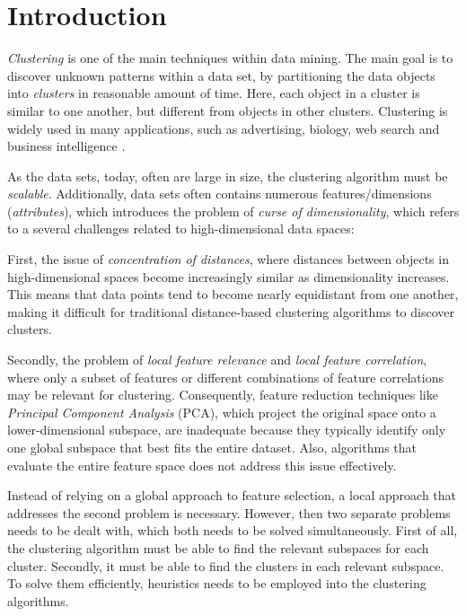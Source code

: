 \section{Introduction}
\textit{Clustering} is one of the main techniques within data mining. The main goal is to discover unknown patterns within a data set, by partitioning the data objects into \textit{clusters} in reasonable amount of time. Here, each object in a cluster is similar to one another, but different from objects in other clusters. Clustering is widely used in many applications, such as advertising, biology, web search and business intelligence \cite[p.~444]{han-2011}.

As the data sets, today, often are large in size, the clustering algorithm must be \textit{scalable}. Additionally, data sets often contains numerous features/dimensions (\textit{attributes}), which introduces the problem of \textit{curse of dimensionality}, which refers to a several challenges related to high-dimensional data spaces:

First, the issue of \textit{concentration of distances}, where distances between objects in high-dimensional spaces become increasingly similar as dimensionality increases. This means that data points tend to become nearly equidistant from one another, making it difficult for traditional distance-based clustering algorithms to discover clusters.

Secondly, the problem of \textit{local feature relevance} and \textit{local feature correlation}, where only a subset of features or different combinations of feature correlations may be relevant for clustering. Consequently, feature reduction techniques like \textit{Principal Component Analysis} (PCA), which project the original space onto a lower-dimensional subspace, are inadequate because they typically identify only one global subspace that best fits the entire dataset. Also, algorithms that evaluate the entire feature space does not address this issue effectively. \cite[p.~43--46]{kriegel-2009}

Instead of relying on a global approach to feature selection, a local approach that addresses the second problem is necessary. However, then two separate problems needs to be dealt with, which both needs to be solved simultaneously. First of all, the clustering algorithm must be able to find the relevant subspaces for each cluster. Secondly, it must be able to find the clusters in each relevant subspace. To solve them efficiently, heuristics needs to be employed into the clustering algorithms. \cite[p.~6--7]{kriegel-2009}

